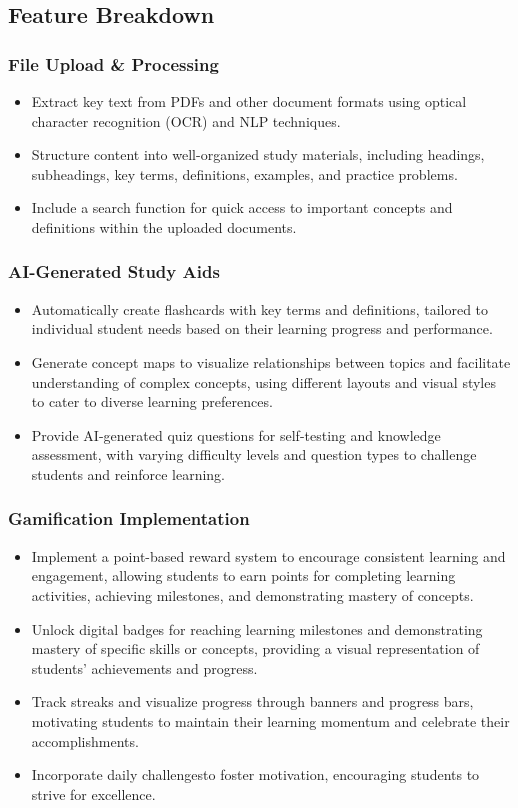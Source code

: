 \documentclass[
	letterpaper, %
]{jdf}
\begin{document}
\subsection{Feature Breakdown}
\subsubsection{File Upload \& Processing}
\begin{itemize}
    \item Extract key text from PDFs and other document formats using optical character recognition (OCR) and NLP techniques.
    \item Structure content into well-organized study materials, including headings, subheadings, key terms, definitions, examples, and practice problems.
    \item Include a search function for quick access to important concepts and definitions within the uploaded documents.
\end{itemize}

\subsubsection{AI-Generated Study Aids}
\begin{itemize}
    \item Automatically create flashcards with key terms and definitions, tailored to individual student needs based on their learning progress and performance.
    \item Generate concept maps to visualize relationships between topics and facilitate understanding of complex concepts, using different layouts and visual styles to cater to diverse learning preferences.
    \item Provide AI-generated quiz questions for self-testing and knowledge assessment, with varying difficulty levels and question types to challenge students and reinforce learning.
\end{itemize}

\subsubsection{Gamification Implementation}
\begin{itemize}
    \item Implement a point-based reward system to encourage consistent learning and engagement, allowing students to earn points for completing learning activities, achieving milestones, and demonstrating mastery of concepts.
    \item Unlock digital badges for reaching learning milestones and demonstrating mastery of specific skills or concepts, providing a visual representation of students' achievements and progress.
    \item Track streaks and visualize progress through banners and progress bars, motivating students to maintain their learning momentum and celebrate their accomplishments.
    \item Incorporate daily challengesto foster motivation, encouraging students to strive for excellence.
\end{itemize}
\end{document}
